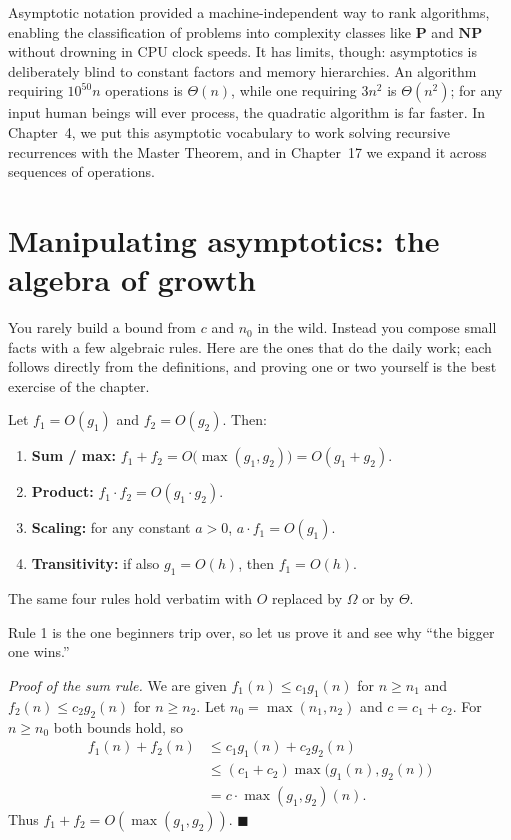 \begin{historybox}
Asymptotic notation provided a machine-independent way to rank algorithms, enabling the
classification of problems into complexity classes like $\mathbf{P}$ and $\mathbf{NP}$ without
drowning in CPU clock speeds. It has limits, though: asymptotics is deliberately blind to
constant factors and memory hierarchies. An algorithm requiring $10^{50}n$ operations is
$\Theta(n)$, while one requiring $3n^2$ is $\Theta(n^2)$; for any input human beings will ever
process, the quadratic algorithm is far faster. In Chapter~4, we put this asymptotic vocabulary
to work solving recursive recurrences with the Master Theorem, and in Chapter~17 we expand it across
sequences of operations.
\end{historybox}

\section{Manipulating asymptotics: the algebra of growth}

You rarely build a bound from $c$ and $n_0$ in the wild. Instead you compose small
facts with a few algebraic rules. Here are the ones that do the daily work; each follows
directly from the definitions, and proving one or two yourself is the best exercise of
the chapter.

\begin{formalbox}
\begin{lemma}\label{ch03:lem-rules}
Let $f_1 = O(g_1)$ and $f_2 = O(g_2)$. Then:
\begin{enumerate}
  \item \textbf{Sum / max:} $f_1 + f_2 = O\bigl(\max(g_1,g_2)\bigr) = O(g_1 + g_2)$.
  \item \textbf{Product:} $f_1 \cdot f_2 = O(g_1 \cdot g_2)$.
  \item \textbf{Scaling:} for any constant $a>0$, $a\cdot f_1 = O(g_1)$.
  \item \textbf{Transitivity:} if also $g_1 = O(h)$, then $f_1 = O(h)$.
\end{enumerate}
The same four rules hold verbatim with $O$ replaced by $\Omega$ or by $\Theta$.
\end{lemma}
\end{formalbox}

Rule 1 is the one beginners trip over, so let us prove it and see why ``the bigger one
wins.''

\begin{formalbox}
\emph{Proof of the sum rule.} We are given $f_1(n) \le c_1 g_1(n)$ for $n\ge n_1$ and
$f_2(n) \le c_2 g_2(n)$ for $n \ge n_2$. Let $n_0 = \max(n_1,n_2)$ and $c = c_1 + c_2$.
For $n \ge n_0$ both bounds hold, so
\begin{align*}
  f_1(n) + f_2(n) 
  &\le c_1 g_1(n) + c_2 g_2(n) \\
  &\le (c_1 + c_2)\max\bigl(g_1(n), g_2(n)\bigr) \\
  &= c\cdot \max(g_1,g_2)(n).
\end{align*}
Thus $f_1 + f_2 = O(\max(g_1,g_2))$. \hfill$\blacksquare$
\end{formalbox}

